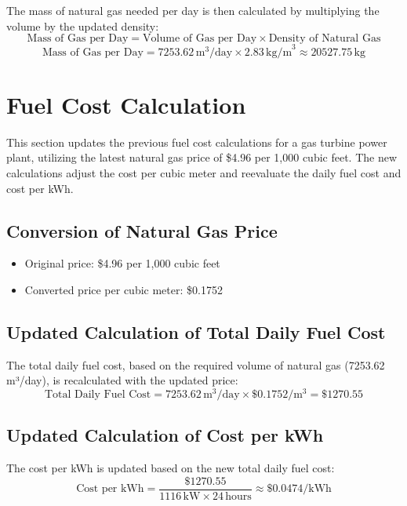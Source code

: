 \documentclass{article}
\begin{document}
The mass of natural gas needed per day is then calculated by multiplying the volume by the updated density:
\[ \text{Mass of Gas per Day} = \text{Volume of Gas per Day} \times \text{Density of Natural Gas} \]
\[ \text{Mass of Gas per Day} = 7253.62 \, \text{m}^3/\text{day} \times 2.83 \, \text{kg/m}^3 \approx 20527.75 \, \text{kg} \]

\section{Fuel Cost Calculation}
This section updates the previous fuel cost calculations for a gas turbine power plant, utilizing the latest natural gas price of \$4.96 per 1,000 cubic feet. The new calculations adjust the cost per cubic meter and reevaluate the daily fuel cost and cost per kWh.

\subsection{Conversion of Natural Gas Price}
\begin{itemize}
    \item Original price: \$4.96 per 1,000 cubic feet
    \item Converted price per cubic meter: \$0.1752
\end{itemize}

\subsection{Updated Calculation of Total Daily Fuel Cost}
The total daily fuel cost, based on the required volume of natural gas (7253.62 m³/day), is recalculated with the updated price:
\[ \text{Total Daily Fuel Cost} = 7253.62 \, \text{m}^3/\text{day} \times \$0.1752/\text{m}^3 = \$1270.55 \]

\subsection{Updated Calculation of Cost per kWh}
The cost per kWh is updated based on the new total daily fuel cost:
\[ \text{Cost per kWh} = \frac{\$1270.55}{1116 \, \text{kW} \times 24 \, \text{hours}} \approx \$0.0474/\text{kWh} \]
\end{document}
